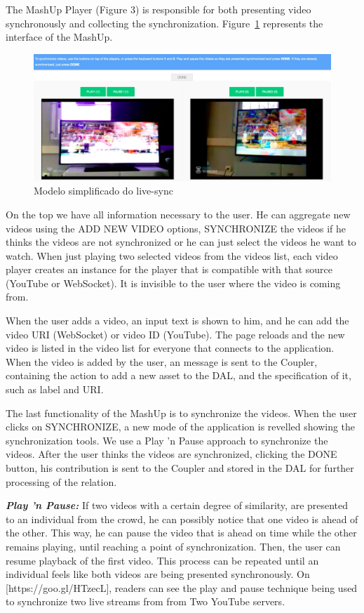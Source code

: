 \documentclass[jidm,a4paper]{jidm} %
\begin{document}
The MashUp Player (Figure 3) is responsible for both presenting video synchronously and collecting the synchronization. Figure~\ref{screen1} represents the interface of the MashUp.

\begin{figure}
	\centerline{\includegraphics[scale=0.3] {figure/screen}}
	\caption{Modelo simplificado do live-sync}
	\label{screen1}
\end{figure}

On the top we have all information necessary to the user. He can aggregate new videos using the ADD NEW VIDEO options, SYNCHRONIZE the videos if he thinks the videos are not synchronized or he can just select the videos he want to watch. When just playing two selected videos from the videos list, each video player creates an instance for the player that is compatible with that source (YouTube or WebSocket). It is invisible to the user where the video is coming from.

When the user adds a video, an input text is shown to him, and he can add the video URI (WebSocket) or video ID (YouTube). The page reloads and the new video is listed in the video list for everyone that connects to the application. When the video is added by the user, an message is sent to the Coupler, containing the action to add a new asset to the DAL, and the specification of it, such as label and URI.

The last functionality of the MashUp is to synchronize the videos. When the user clicks on SYNCHRONIZE, a new mode of the application is revelled showing the synchronization tools. We use a Play 'n Pause approach to synchronize the videos. After the user thinks the videos are synchronized, clicking the DONE button, his contribution is sent to the Coupler and stored in the DAL for further processing of the relation.

\textbf{\textit{Play 'n Pause:}} If two videos with a certain degree of similarity, are presented to an individual from the crowd, he can possibly notice that one video is ahead of the other. This way, he can pause the video that is ahead on time while the other remains playing, until reaching a point of synchronization. Then, the user can resume playback of the first video. This process can be repeated until an individual feels like both videos are being presented synchronously. On [https://goo.gl/HTzecL], readers can see the play and pause technique being used to synchronize two live streams from from Two YouTube servers.
\end{document}
